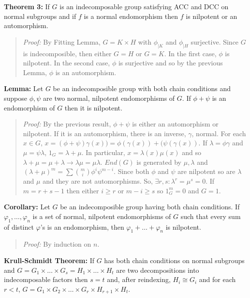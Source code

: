 {\bf Theorem 3:}
If $G$ is an indecomposable group satisfying ACC and DCC on normal subgroups
and if $f$ is a normal endomorphism then $f$ is nilpotent or an automorphism.
\begin{quote}
\emph{Proof:}  
By Fitting Lemma, $G= K \times H$ with $\phi_{|K}$ and $\phi_{|H}$ surjective.
Since $G$ is indecomposible, then either $G=H$ or $G=K$.  In the first case,
$\phi$ is nilpotent.  In the second case, $\phi$ is surjective and so by the previous Lemma,
$\phi$ is an automorphism.
\end{quote}
{\bf Lemma:} Let $G$ be an indecomposible group with both chain conditions and
suppose $\phi, \psi$ are two normal, nilpotent endomorphisms of $G$.  If $\phi+\psi$ is
an endomorphism of $G$ then it is nilpotent.
\begin{quote}
\emph{Proof:}  
By the previous result, 
$\phi+\psi$ is either an automorphism or nilpotent.
If it is an automorphism, there is an inverse, $\gamma$, normal.
For each $x \in G$, $x= (\phi+\psi) \gamma(x))= \phi(\gamma(x)) + (\psi(\gamma(x))$. 
If $\lambda= \phi \gamma$  and $\mu= \psi \lambda$,
$1_G= \lambda+\mu$.  In particular,
$x= \lambda(x) \mu(x)$ and so $\lambda+\mu= \mu+\lambda \rightarrow \lambda \mu = \mu \lambda$.
$End(G)$ is generated by $\mu, \lambda$ and 
$(\lambda + \mu)^m = \sum {m \choose i} \phi^i \psi^{m-i}$.  Since both
$\phi$ and $\psi$ are nilpotent so are $\lambda$ and $\mu$ and they are not automorphisms.
So, $\exists r, s: \lambda^r=\mu^s=0$.  If $m=r+s-1$ then either
$i \ge r$ or $m-i \ge s$ so $1_G^m =0$ and $G=1$.
\end{quote}
{\bf Corollary:}  Let $G$ be an indecomposible group having both chain conditions.
If $ \varphi_1, \ldots, \varphi_n $
is a set of normal, nilpotent endomorphisms of $G$ such that every sum of distinct
$\varphi$'s is an endomorphism, then
$ \varphi_1 + \ldots + \varphi_n $ is nilpotent.
\begin{quote}
\emph{Proof:}  By induction on $n$.
\end{quote}
{\bf Krull-Schmidt Theorem:}  If $G$ has both chain conditions on normal subgroups and
$G= G_1 \times \ldots \times G_s = H_1 \times \ldots \times H_t$ are
two decompositions into indecomposable factors then $s=t$ and, after
reindexing, $H_i \cong G_i$ and for each $r<t$, $G= G_1 \times G_2 \times \ldots
\times G_r \times H_{r+1} \times H_t$. 
